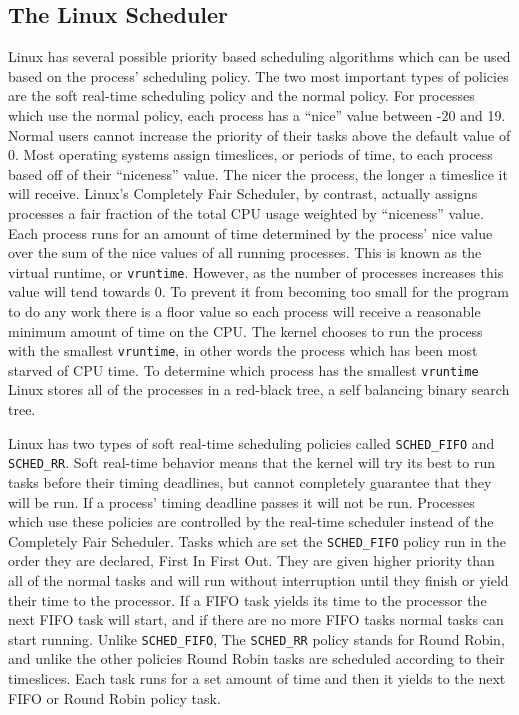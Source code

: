\documentclass[10pt,conference,draftclsnofoot,onecolumn]{IEEEtran}
\begin{document}
\subsection{The Linux Scheduler}
Linux has several possible priority based scheduling algorithms which can be used based on the process' scheduling policy. The two most important types of policies are the soft real-time scheduling policy and the normal policy. For processes which use the normal policy, each process has a ``nice'' value between -20 and 19. Normal users cannot increase the priority of their tasks above the default value of 0. Most operating systems assign timeslices, or periods of time, to each process based off of their ``niceness'' value. The nicer the process, the longer a timeslice it will receive. Linux's Completely Fair Scheduler, by contrast, actually assigns processes a fair fraction of the total CPU usage weighted by ``niceness'' value. Each process runs for an amount of time determined by the process' nice value over the sum of the nice values of all running processes. This is known as the virtual runtime, or \texttt{vruntime}. However, as the number of processes increases this value will tend towards 0. To prevent it from becoming too small for the program to do any work there is a floor value so each process will receive a reasonable minimum amount of time on the CPU. The kernel chooses to run the process with the smallest \texttt{vruntime}, in other words the process which has been most starved of CPU time. To determine which process has the smallest \texttt{vruntime} Linux stores all of the processes in a red-black tree, a self balancing binary search tree.

Linux has two types of soft real-time scheduling policies called \texttt{SCHED\_FIFO} and \texttt{SCHED\_RR}. Soft real-time behavior means that the kernel will try its best to run tasks before their timing deadlines, but cannot completely guarantee that they will be run. If a process' timing deadline passes it will not be run. Processes which use these policies are controlled by the real-time scheduler instead of the Completely Fair Scheduler. Tasks which are set the \texttt{SCHED\_FIFO} policy run in the order they are declared, First In First Out. They are given higher priority than all of the normal tasks and will run without interruption until they finish or yield their time to the processor. If a FIFO task yields its time to the processor the next FIFO task will start, and if there are no more FIFO tasks normal tasks can start running. Unlike \texttt{SCHED\_FIFO}, The \texttt{SCHED\_RR} policy stands for Round Robin, and unlike the other policies Round Robin tasks are scheduled according to their timeslices. Each task runs for a set amount of time and then it yields to the next FIFO or Round Robin policy task\cite{1_love_2010}.
\end{document}
